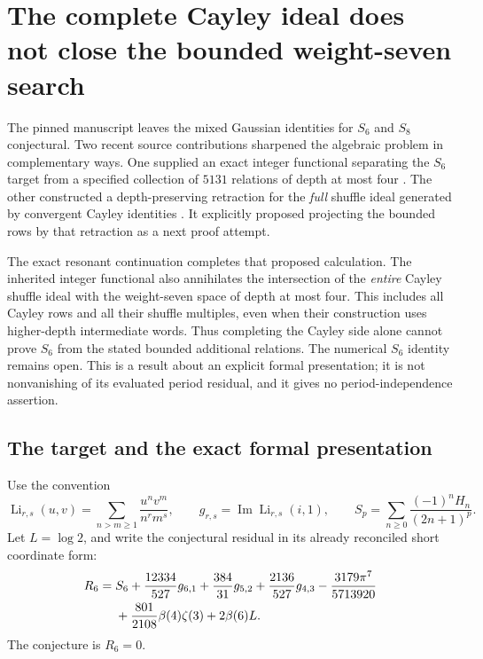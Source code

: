 \providecommand{\shuffle}{\mathbin{\amalg}}
\section{The complete Cayley ideal does not close the bounded weight-seven search}
\label{gf:sec}

The pinned manuscript leaves the mixed Gaussian identities for $S_6$ and
$S_8$ conjectural. Two recent source contributions sharpened the algebraic
problem in complementary ways. One supplied an exact integer functional
separating the $S_6$ target from a specified collection of $5131$ relations
of depth at most four \cite{gf:Bounded}. The other constructed a
depth-preserving retraction for the \emph{full} shuffle ideal generated by
convergent Cayley identities \cite{gf:Depth}. It explicitly proposed
projecting the bounded rows by that retraction as a next proof attempt.

The exact resonant continuation \cite{gf:report} completes that proposed calculation. The inherited integer functional
also annihilates the intersection of the \emph{entire} Cayley shuffle ideal
with the weight-seven space of depth at most four. This includes all
Cayley rows and all their shuffle multiples, even when their construction
uses higher-depth intermediate words. Thus completing the Cayley side
alone cannot prove $S_6$ from the stated bounded additional relations.
The numerical $S_6$ identity remains open. This is a result about an
explicit formal presentation; it is not nonvanishing of its evaluated
period residual, and it gives no period-independence assertion.

\subsection{The target and the exact formal presentation}

Use the convention
\[
 \operatorname{Li}_{r,s}(u,v)=\sum_{n>m\geq1}\frac{u^n v^m}{n^r m^s},
 \qquad g_{r,s}=\operatorname{Im}\operatorname{Li}_{r,s}(i,1),
 \qquad S_p=\sum_{n\geq0}\frac{(-1)^nH_n}{(2n+1)^p}.
\]
Let $L=\log2$, and write the conjectural residual in its already reconciled
short coordinate form:
\begin{align}
 R_6={}&S_6+\frac{12334}{527}g_{6,1}+\frac{384}{31}g_{5,2}
       +\frac{2136}{527}g_{4,3}-\frac{3179\pi^7}{5713920}\notag\\
      &+\frac{801}{2108}\beta(4)\zeta(3)+2\beta(6)L.
 \label{gf:eq:residual}
\end{align}
The conjecture is $R_6=0$.

